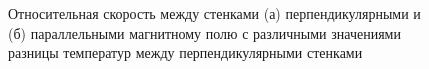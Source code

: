 \begin{figure}[h]
\caption{Относительная скорость между стенками (а) перпендикулярными и (б) параллельными магнитному полю с различными значениями разницы температур между перпендикулярными стенками}
\label{fig:heat_velocity}
\end{figure}

